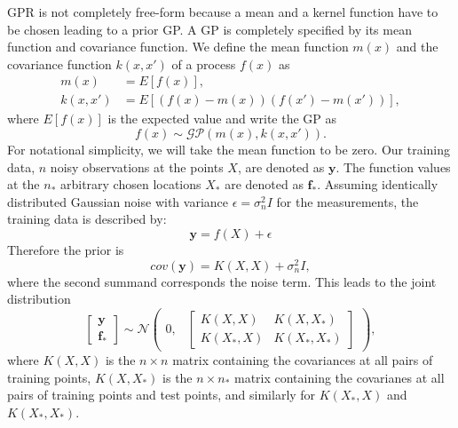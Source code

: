 GPR is not completely free-form because a mean and a kernel function have to be chosen leading to a prior GP.
A GP is completely specified by its mean function and covariance function.
We define the mean function $m(x)$ and the covariance function $k(x,x')$ of a process $f(x)$ as
\begin{align}
m(x) &= E[f(x)], \\
k(x,x') &= E[(f(x)-m(x))(f(x')-m(x'))],
\end{align}
where $E[f(x)]$ is the expected value and write the GP as
\begin{equation}\label{eq:GP}
f(x) \sim \mathcal{GP}(m(x),k(x,x')).
\end{equation}
For notational simplicity, we will take the mean function to be zero.
Our training data, $n$ noisy observations at the points $X$, are denoted as $\mathbf{y}$.
The function values at the $n_*$ arbitrary chosen locations $X_*$ are denoted as $\mathbf{f_*}$.
Assuming identically distributed Gaussian noise with variance $\epsilon = \sigma_n^2I$ for the measurements, the training data is described by:
\begin{equation}\label{eq:trainingdata}
\mathbf{y} = f(X)+\epsilon
\end{equation}
Therefore the prior is
\begin{equation}\label{eq:prior}
cov(\mathbf{y}) = K(X,X)+\sigma_n^2I,
\end{equation}
where the second summand corresponds the noise term. This leads to the joint distribution
\begin{equation}\label{eq:bll}
\begin{bmatrix}
\mathbf{y}\\
\mathbf{f}_*
\end{bmatrix}
\sim \mathcal{N}
\begin{pmatrix}
0, & \begin{bmatrix}
K(X,X) & K(X,X_*)\\
K(X_*,X) & K(X_*,X_*)
\end{bmatrix}
\end{pmatrix},
\end{equation}
where $K(X,X)$ is the $n \times n$ matrix containing the covariances at all pairs of training points, $K(X,X_*)$ is the $n \times n_*$ matrix containing the covarianes at all pairs of training points and test points, and similarly for $K(X_*,X)$ and $K(X_*,X_*)$.

